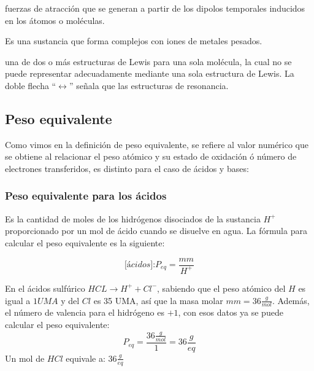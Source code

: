 \begin{definition}
	fuerzas de atracción que se generan
	a partir de los dipolos temporales inducidos en los átomos o moléculas.
\end{definition}

\begin{definition}[Quelato]
	Es una sustancia que forma complejos con iones de metales pesados.
\end{definition}

\begin{definition}[Resonancia]
	una de dos o más estructuras de Lewis para una sola
	molécula, la cual no se puede representar adecuadamente mediante una sola estructura
	de Lewis. La doble flecha ``$\longleftrightarrow$'' señala que las estructuras de resonancia.
\end{definition}

\subsection{Peso equivalente}

Como vimos en la definición de peso equivalente, se refiere al valor numérico que se obtiene al relacionar el peso atómico y su estado
de oxidación ó número de electrones transferidos, es distinto para el caso de ácidos y bases:

\subsubsection{Peso equivalente para los ácidos}

Es la cantidad de moles de los hidrógenos disociados de la sustancia $H^{+}$ proporcionado por un mol de ácido
cuando se disuelve en agua. La fórmula para calcular el peso equivalente es la siguiente:

\begin{equation}
	\textit{[ácidos]:} P_{eq}= \frac{mm}{H^{+}}
\end{equation}

\begin{example}
	En el ácidos sulfúrico $HCL\longrightarrow H^{+}+Cl^{-}$, sabiendo que el peso atómico del $H$ es igual a $1 UMA$ y del
	$Cl$ es 35 UMA, así que la masa molar $mm=36\frac{g}{mol}$.
	Además, el número de valencia para el hidrógeno es $+1$, con esos
	datos ya se puede calcular el peso equivalente:
	\begin{equation*}
		P_{eq}= \frac{36\frac{g}{mol}}{1} = 36 \frac{g}{eq}
	\end{equation*}
	Un mol de $HCl$ equivale a: $36 \frac{g}{eq}$
\end{example}


